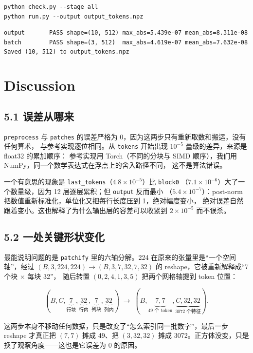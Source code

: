 \documentclass[a4paper,12pt]{article}
\begin{document}
\begin{verbatim}
python check.py --stage all
python run.py --output output_tokens.npz
\end{verbatim}

\begin{verbatim}
output       PASS shape=(10, 512) max_abs=5.439e-07 mean_abs=8.311e-08
batch        PASS shape=(3, 512)  max_abs=4.619e-07 mean_abs=7.632e-08
Saved (10, 512) to output_tokens.npz
\end{verbatim}

\section{Discussion}

\subsection*{5.1 误差从哪来}

\texttt{preprocess} 与 \texttt{patches} 的误差严格为 0，因为这两步只有重新取数和搬运，没有任何算术，
与参考实现逐位相同。从 \texttt{tokens} 开始出现 $10^{-5}$ 量级的差异，来源是 float32 的累加顺序：
参考实现用 Torch（不同的分块与 SIMD 顺序），我们用 NumPy，同一个数学表达式在浮点上的舍入路径不同，
这不是算法错误。

一个有意思的现象是 \texttt{last\_tokens}（$4.8\times10^{-5}$）比 \texttt{block0}
（$7.1\times10^{-6}$）大了一个数量级，因为 12 层逐层累积；但 \texttt{output} 反而最小
（$5.4\times10^{-7}$）：post-norm 把数值重新标准化，单位化又把每行长度压到 1，绝对幅度变小，
绝对误差自然跟着变小。这也解释了为什么输出层的容差可以收紧到 $2\times10^{-5}$ 而不误杀。

\subsection*{5.2 一处关键形状变化}

最能说明问题的是 \texttt{patchify} 里的六轴分解。224 在原来的张量里是“一个空间轴”，经过
$(B,3,224,224)\to(B,3,7,32,7,32)$ 的 reshape，它被重新解释成“7 个块 $\times$ 每块 32”，
随后转置 $(0,2,4,1,3,5)$ 把两个网格轴提到 token 位置：

\[
(B,C,\underbrace{7}_{\text{行块}},\underbrace{32}_{\text{行内}},\underbrace{7}_{\text{列块}},\underbrace{32}_{\text{列内}})
\;\longrightarrow\;
(B,\underbrace{7,7}_{\text{49 个 token}},\underbrace{C,32,32}_{\text{3072 个特征}}).
\]

这两步本身不移动任何数据，只是改变了“怎么索引同一批数字”，最后一步 reshape 才真正把
$(7,7)$ 摊成 49、把 $(3,32,32)$ 摊成 3072。正方体没变，只是换了观察角度——这也是它误差为 0 的原因。
\end{document}
